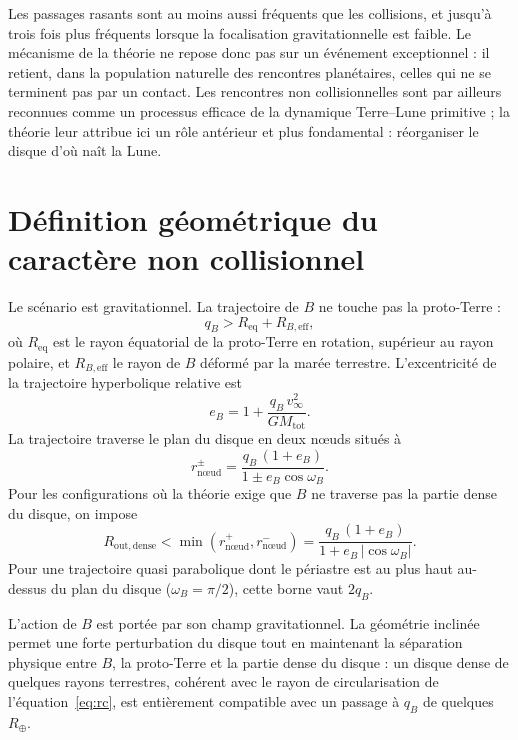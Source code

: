 \documentclass[11pt,a4paper,openany]{report}
\newcommand{\Rt}{R_{\oplus}}
\newcommand{\Req}{R_{\mathrm{eq}}}
\newcommand{\Mtot}{M_{\mathrm{tot}}}
\begin{document}
\begin{apport}
Les passages rasants sont au moins aussi fréquents que les collisions, et jusqu'à trois fois
plus fréquents lorsque la focalisation gravitationnelle est faible. Le mécanisme de la théorie
ne repose donc pas sur un événement exceptionnel : il retient, dans la population naturelle des
rencontres planétaires, celles qui ne se terminent pas par un contact. Les rencontres non
collisionnelles sont par ailleurs reconnues comme un processus efficace de la dynamique
Terre--Lune primitive \cite{PahlevanMorbidelli2015} ; la théorie leur attribue ici un rôle
antérieur et plus fondamental : réorganiser le disque d'où naît la Lune.
\end{apport}

\section{Définition géométrique du caractère non collisionnel}

Le scénario est gravitationnel. La trajectoire de $B$ ne touche pas la proto-Terre :
\begin{equation}
q_B>\Req+R_{B,\mathrm{eff}},
\label{eq:nc}
\end{equation}
où $\Req$ est le rayon équatorial de la proto-Terre en rotation, supérieur au rayon polaire, et
$R_{B,\mathrm{eff}}$ le rayon de $B$ déformé par la marée terrestre. L'excentricité de la
trajectoire hyperbolique relative est
\begin{equation}
e_B=1+\frac{q_B\,v_\infty^2}{G\Mtot}.
\label{eq:eB}
\end{equation}
La trajectoire traverse le plan du disque en deux nœuds situés à
\begin{equation}
r_{\text{nœud}}^{\pm}=\frac{q_B\,(1+e_B)}{1\pm e_B\cos\omega_B}.
\label{eq:noeuds}
\end{equation}
Pour les configurations où la théorie exige que $B$ ne traverse pas la partie dense du disque,
on impose
\begin{equation}
R_{\mathrm{out,dense}}<\min\left(r_{\text{nœud}}^{+},r_{\text{nœud}}^{-}\right)
=\frac{q_B\,(1+e_B)}{1+e_B\,|\cos\omega_B|}.
\label{eq:nontraversee}
\end{equation}
Pour une trajectoire quasi parabolique dont le périastre est au plus haut au-dessus du plan du
disque ($\omega_B=\pi/2$), cette borne vaut $2q_B$.

\begin{lecture}
L'action de $B$ est portée par son champ gravitationnel. La géométrie inclinée permet une forte
perturbation du disque tout en maintenant la séparation physique entre $B$, la proto-Terre et
la partie dense du disque : un disque dense de quelques rayons terrestres, cohérent avec le
rayon de circularisation de l'équation~\eqref{eq:rc}, est entièrement compatible avec un passage
à $q_B$ de quelques $\Rt$.
\end{lecture}
\end{document}
